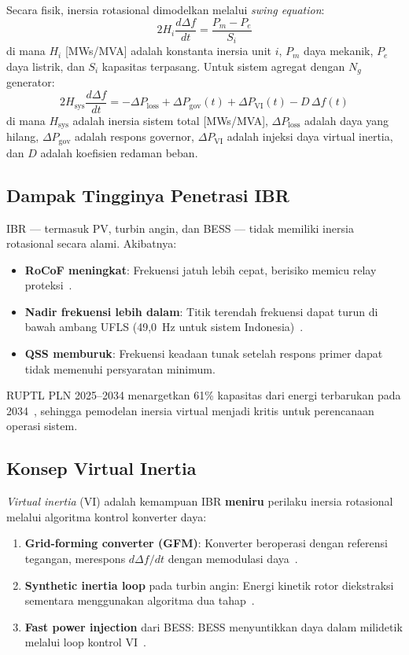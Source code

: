 \documentclass[journal]{IEEEtran}
\newcommand{\Hsys}{H_{\mathrm{sys}}}
\newcommand{\Ploss}{\Delta P_{\mathrm{loss}}}
\begin{document}
Secara fisik, inersia rotasional dimodelkan melalui
\textit{swing equation}:
\begin{equation}
  2H_i \frac{d\Delta f}{dt} = \frac{P_m - P_e}{S_i}
  \label{eq:swing_basic}
\end{equation}
di mana $H_i$ [MWs/MVA] adalah konstanta inersia unit $i$,
$P_m$ daya mekanik, $P_e$ daya listrik, dan $S_i$ kapasitas
terpasang. Untuk sistem agregat dengan $N_g$ generator:
\begin{equation}
  2\Hsys \frac{d\Delta f}{dt} =
    -\Ploss + \Delta P_{\mathrm{gov}}(t)
    + \Delta P_{\mathrm{VI}}(t) - D\,\Delta f(t)
  \label{eq:swing_sys}
\end{equation}
di mana $\Hsys$ adalah inersia sistem total [MWs/MVA],
$\Ploss$ adalah daya yang hilang, $\Delta P_{\mathrm{gov}}$
adalah respons governor, $\Delta P_{\mathrm{VI}}$ adalah
injeksi daya virtual inertia, dan $D$ adalah koefisien
redaman beban.

\subsection{Dampak Tingginya Penetrasi IBR}

IBR --- termasuk PV, turbin angin, dan BESS --- tidak
memiliki inersia rotasional secara alami. Akibatnya:
\begin{itemize}
  \item \textbf{RoCoF meningkat}: Frekuensi jatuh lebih
    cepat, berisiko memicu relay proteksi~\cite{Tielens2016}.
  \item \textbf{Nadir frekuensi lebih dalam}: Titik terendah
    frekuensi dapat turun di bawah ambang UFLS
    (49{,}0~Hz untuk sistem Indonesia)~\cite{ESDM2007}.
  \item \textbf{QSS memburuk}: Frekuensi keadaan tunak
    setelah respons primer dapat tidak memenuhi
    persyaratan minimum.
\end{itemize}

RUPTL PLN 2025--2034 menargetkan 61\% kapasitas dari
energi terbarukan pada 2034~\cite{PLN2025}, sehingga
pemodelan inersia virtual menjadi kritis untuk perencanaan
operasi sistem.

\subsection{Konsep Virtual Inertia}

\textit{Virtual inertia} (VI) adalah kemampuan IBR
\textbf{meniru} perilaku inersia rotasional melalui
algoritma kontrol konverter daya:
\begin{enumerate}
  \item \textbf{Grid-forming converter (GFM)}: Konverter
    beroperasi dengan referensi tegangan, merespons
    $d\Delta f/dt$ dengan memodulasi daya~\cite{Asiedu2025}.
  \item \textbf{Synthetic inertia loop} pada turbin angin:
    Energi kinetik rotor diekstraksi sementara menggunakan
    algoritma dua tahap~\cite{Chu2020}.
  \item \textbf{Fast power injection} dari BESS: BESS
    menyuntikkan daya dalam milidetik melalui loop
    kontrol VI~\cite{Wen2016}.
\end{enumerate}
\end{document}
